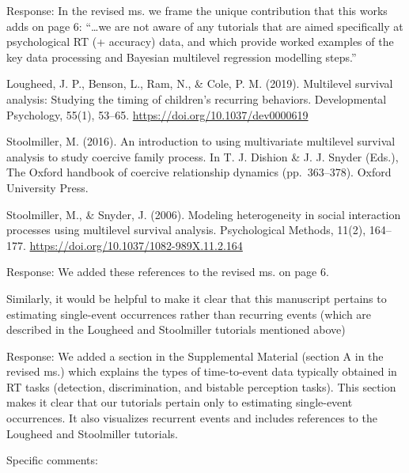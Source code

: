\documentclass[
]{article}
\renewenvironment{quote}{\begin{leftbar}}{\end{leftbar}}
\begin{document}
Response: In the revised ms. we frame the unique contribution that this
works adds on page 6: ``\ldots we are not aware of any tutorials that
are aimed specifically at psychological RT (+ accuracy) data, and which
provide worked examples of the key data processing and Bayesian
multilevel regression modelling steps.''

\begin{quote}
Lougheed, J. P., Benson, L., Ram, N., \& Cole, P. M. (2019). Multilevel
survival analysis: Studying the timing of children's recurring
behaviors. Developmental Psychology, 55(1), 53--65.
\url{https://doi.org/10.1037/dev0000619}
\end{quote}

\begin{quote}
Stoolmiller, M. (2016). An introduction to using multivariate multilevel
survival analysis to study coercive family process. In T. J. Dishion \&
J. J. Snyder (Eds.), The Oxford handbook of coercive relationship
dynamics (pp.~363--378). Oxford University Press.
\end{quote}

\begin{quote}
Stoolmiller, M., \& Snyder, J. (2006). Modeling heterogeneity in social
interaction processes using multilevel survival analysis. Psychological
Methods, 11(2), 164--177.
\url{https://doi.org/10.1037/1082-989X.11.2.164}
\end{quote}

Response: We added these references to the revised ms. on page 6.

\begin{quote}
Similarly, it would be helpful to make it clear that this manuscript
pertains to estimating single-event occurrences rather than recurring
events (which are described in the Lougheed and Stoolmiller tutorials
mentioned above)
\end{quote}

Response: We added a section in the Supplemental Material (section A in
the revised ms.) which explains the types of time-to-event data
typically obtained in RT tasks (detection, discrimination, and bistable
perception tasks). This section makes it clear that our tutorials
pertain only to estimating single-event occurrences. It also visualizes
recurrent events and includes references to the Lougheed and Stoolmiller
tutorials.

\begin{quote}
Specific comments:
\end{quote}
\end{document}
